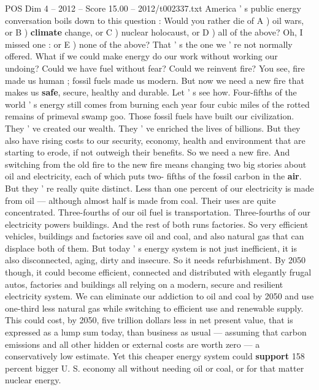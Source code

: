 \begin{textsample}{POS Dim 4 – 2012 – Score 15.00 – 2012/t002337.txt}  \label{ex:f4_pos_073}
America ' s public energy conversation boils down to this question : Would you rather die of A ) oil wars, or B ) \textbf{climate} change, or C ) nuclear holocaust, or D ) all of the above?
Oh, I missed one : or E ) none of the above?
That ' s the one we ' re not normally offered.
What if we could make energy do our work without working our undoing?
Could we have fuel without fear?
Could we reinvent fire?
You see, fire made us human ; fossil fuels made us modern.
But now we need a new fire that makes us \textbf{safe}, secure, healthy and durable.
Let ' s see how.
Four-fifths of the world ' s energy still comes from burning each year four cubic miles of the rotted remains of primeval swamp goo.
Those fossil fuels have built our civilization.
They ' ve created our wealth.
They ' ve enriched the lives of billions.
But they also have rising costs to our security, economy, health and environment that are starting to erode, if not outweigh their benefits.
So we need a new fire.
And switching from the old fire to the new fire means changing two big stories about oil and electricity, each of which puts two- fifths of the fossil carbon in the \textbf{air}.
But they ' re really quite distinct.
Less than one percent of our electricity is made from oil — although almost half is made from coal.
Their uses are quite concentrated.
Three-fourths of our oil fuel is transportation.
Three-fourths of our electricity powers buildings.
And the rest of both runs factories.
So very efficient vehicles, buildings and factories save oil and coal, and also natural gas that can displace both of them.
But today ' s energy system is not just inefficient, it is also disconnected, aging, dirty and insecure.
So it needs refurbishment.
By 2050 though, it could become efficient, connected and distributed with elegantly frugal autos, factories and buildings all relying on a modern, secure and resilient electricity system.
We can eliminate our addiction to oil and coal by 2050 and use one-third less natural gas while switching to efficient use and renewable supply.
This could cost, by 2050, five trillion dollars less in net present value, that is expressed as a lump sum today, than business as usual — assuming that carbon emissions and all other hidden or external costs are worth zero — a conservatively low estimate.
Yet this cheaper energy system could \textbf{support} 158 percent bigger U.
S. economy all without needing oil or coal, or for that matter nuclear energy.

\end{textsample}
